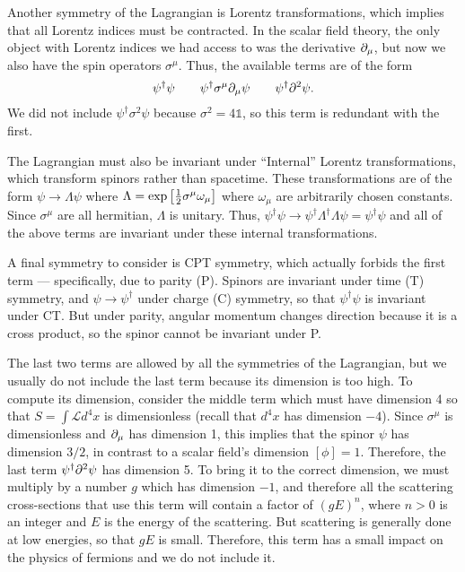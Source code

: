Another symmetry of the Lagrangian is Lorentz transformations, which implies that all Lorentz indices must be contracted. In the scalar field theory, the only object with Lorentz indices we had access to was the derivative $\partial_\mu$, but now we also have the spin operators $\sigma^\mu$. Thus, the available terms are of the form
$$\psi^\dagger \psi \qquad \psi^\dagger \sigma^\mu \partial_\mu \psi \qquad \psi^\dagger \partial^2 \psi.$$
We did not include $\psi^\dagger \sigma^2 \psi$ because $\sigma^2 = 4\mathds{1}$, so this term is redundant with the first.

The Lagrangian must also be invariant under ``Internal'' Lorentz transformations, which transform spinors rather than spacetime. These transformations are of the form $\psi \rightarrow \Lambda \psi$ where $\Lambda = \exp \left[ \frac{1}{2}\sigma^\mu \omega_\mu \right]$ where $\omega_\mu$ are arbitrarily chosen constants. Since $\sigma^\mu$ are all hermitian, $\Lambda$ is unitary. Thus, $\psi^\dagger \psi \rightarrow \psi^\dagger \Lambda^\dagger \Lambda \psi = \psi^\dagger \psi$ and all of the above terms are invariant under these internal transformations.

A final symmetry to consider is CPT symmetry, which actually forbids the first term --- specifically, due to parity (P). Spinors are invariant under time (T) symmetry, and $\psi \rightarrow \psi^\dagger$ under charge (C) symmetry, so that $\psi^\dagger \psi$ is invariant under CT. But under parity, angular momentum changes direction because it is a cross product, so the spinor cannot be invariant under P.

The last two terms are allowed by all the symmetries of the Lagrangian, but we usually do not include the last term because its dimension is too high. To compute its dimension, consider the middle term which must have dimension 4 so that $S = \int \mathcal{L} d^4x$ is dimensionless (recall that $d^4 x$ has dimension $-4$). Since $\sigma^\mu$ is dimensionless and $\partial_\mu$ has dimension 1, this implies that the spinor $\psi$ has dimension $3/2$, in contrast to a scalar field's dimension $[\phi] = 1$. Therefore, the last term $\psi^\dagger \partial^2 \psi$ has dimension 5. To bring it to the correct dimension, we must multiply by a number $g$ which has dimension $-1$, and therefore all the scattering cross-sections that use this term will contain a factor of $(gE)^n$, where $n>0$ is an integer and $E$ is the energy of the scattering. But scattering is generally done at low energies, so that $gE$ is small. Therefore, this term has a small impact on the physics of fermions and we do not include it.


